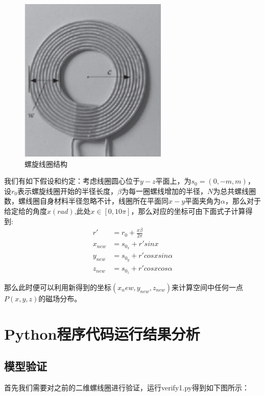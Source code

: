 \documentclass{article}
\begin{document}
\begin{figure}[h]
  \centering
  \includegraphics[scale=0.4]{constr2.png}
  \caption{螺旋线圈结构}
  \label{fig:example}
\end{figure}

我们有如下假设和约定：考虑线圈圆心位于$y-z$平面上，为$s_0 = (0, -m, m)$，设$r_0$表示螺旋线圈开始的半径长度，$\beta$为每一圈螺线增加的半径，$N$为总共螺线圈数，螺线圈自身材料半径忽略不计，线圈所在平面同$x-y$平面夹角为$\alpha$，那么对于给定给的角度$x(rad)$,此处$x\in[0, 10\pi]$，那么对应的坐标可由下面式子计算得到:
\[
\begin{aligned}
    r' &= r_0 + \frac{x\beta}{2\pi}\\
    x_{new} &= s_{0_x} + r'sinx \\
    y_{new} &= s_{0_y} + r'cosxsin\alpha\\
    z_{new} &= s_{0_z} + r'cosxcos\alpha
\end{aligned}
\]

那么此时便可以利用新得到的坐标$(x_new, y_{new}, z_{new})$来计算空间中任何一点$P(x, y, z)$的磁场分布。


\newpage



\section{Python程序代码运行结果分析}

\subsection{模型验证}
首先我们需要对之前的二维螺线圈进行验证，运行verify1.py得到如下图所示：
\end{document}
